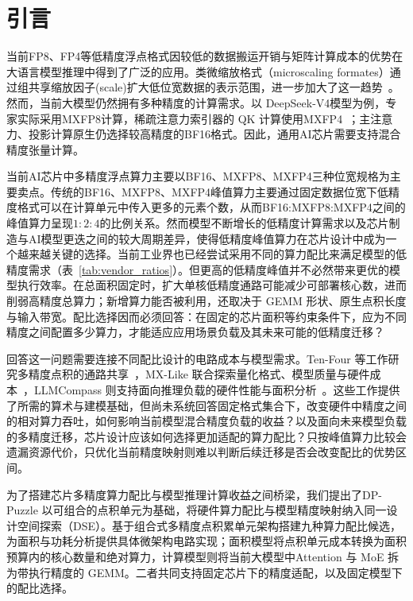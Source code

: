 \section{引言}
\label{sec:introduction}
当前FP8、FP4等低精度浮点格式因较低的数据搬运开销与矩阵计算成本的优势在大语言模型推理中得到了广泛的应用。类微缩放格式（microscaling formates）通过组共享缩放因子(scale)扩大低位宽数据的表示范围，进一步加大了这一趋势~\cite{ocpmx2023,nvidia2024nvfp4,hifloat4}。然而，当前大模型仍然拥有多种精度的计算需求。以 DeepSeek-V4模型为例，专家实际采用MXFP8计算，稀疏注意力索引器的 QK 计算使用MXFP4~\cite{deepseekv4}；主注意力、投影计算原生仍选择较高精度的BF16格式。因此，通用AI芯片需要支持混合精度张量计算。

当前AI芯片中多精度浮点算力主要以BF16、MXFP8、MXFP4三种位宽规格为主要卖点。传统的BF16、MXFP8、MXFP4峰值算力主要通过固定数据位宽下低精度格式可以在计算单元中传入更多的元素个数，从而BF16:MXFP8:MXFP4之间的峰值算力呈现$1:2:4$的比例关系。然而模型不断增长的低精度计算需求以及芯片制造与AI模型更迭之间的较大周期差异，使得低精度峰值算力在芯片设计中成为一个越来越关键的选择。当前工业界也已经尝试采用不同的算力配比来满足模型的低精度需求（表~\ref{tab:vendor_ratios}）。但更高的低精度峰值并不必然带来更优的模型执行效率。在总面积固定时，扩大单核低精度通路可能减少可部署核心数，进而削弱高精度总算力；新增算力能否被利用，还取决于 GEMM 形状、原生点积长度与输入带宽。配比选择因而必须回答：在固定的芯片面积等约束条件下，应为不同精度之间配置多少算力，才能适应应用场景负载及其未来可能的低精度迁移？

回答这一问题需要连接不同配比设计的电路成本与模型需求。Ten-Four 等工作研究多精度点积的通路共享~\cite{rout2026tenfourv3}，MX-Like 联合探索量化格式、模型质量与硬件成本~\cite{zhao2026mxlike}，LLMCompass 则支持面向推理负载的硬件性能与面积分析~\cite{zhang2024llmcompass}。这些工作提供了所需的算术与建模基础，但尚未系统回答固定格式集合下，改变硬件中精度之间的相对算力吞吐，如何影响当前模型混合精度负载的收益？以及面向未来模型负载的多精度迁移，芯片设计应该如何选择更加适配的算力配比？只按峰值算力比较会遗漏资源代价，只优化当前精度映射则难以判断后续迁移是否会改变配比的优势区间。%

为了搭建芯片多精度算力配比与模型推理计算收益之间桥梁，我们提出了DP-Puzzle 以可组合的点积单元为基础，将硬件算力配比与模型精度映射纳入同一设计空间探索（DSE）。基于组合式多精度点积累单元架构搭建九种算力配比候选，为面积与功耗分析提供具体微架构电路实现；面积模型将点积单元成本转换为面积预算内的核心数量和绝对算力，计算模型则将当前大模型中Attention 与 MoE 拆为带执行精度的 GEMM。二者共同支持固定芯片下的精度适配，以及固定模型下的配比选择。%

